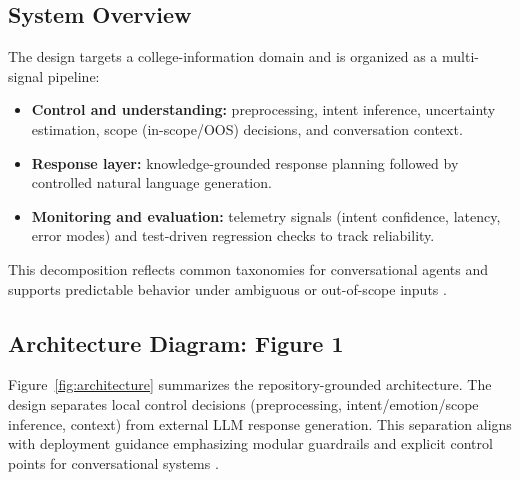 \documentclass[12pt,onecolumn]{report}
\begin{document}
\subsection{System Overview}
The design targets a college-information domain and is organized as a multi-signal pipeline:
\begin{itemize}
	\item \textbf{Control and understanding:} preprocessing, intent inference, uncertainty estimation, scope (in-scope/OOS) decisions, and conversation context.
	\item \textbf{Response layer:} knowledge-grounded response planning followed by controlled natural language generation.
	\item \textbf{Monitoring and evaluation:} telemetry signals (intent confidence, latency, error modes) and test-driven regression checks to track reliability.
\end{itemize}
This decomposition reflects common taxonomies for conversational agents and supports predictable behavior under ambiguous or out-of-scope inputs \cite{hussain2019survey,larson2019clinc150,casanueva2020banking77}.

\subsection{Architecture Diagram: Figure 1}
Figure~\ref{fig:architecture} summarizes the repository-grounded architecture. The design separates local control decisions (preprocessing, intent/emotion/scope inference, context) from external LLM response generation. This separation aligns with deployment guidance emphasizing modular guardrails and explicit control points for conversational systems \cite{khatri2018alexa,roller2021recipes,ouyang2022rlhf}.
\end{document}
